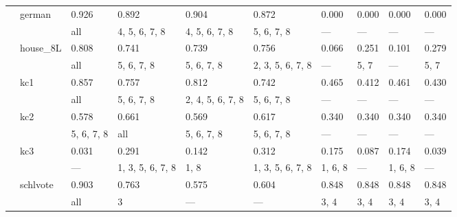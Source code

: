 \documentclass{article}
\begin{document}
\begin{center}
\begin{longtable}{p{1.2cm}p{1.8cm}p{1cm}p{1cm}p{1cm}p{1cm}p{1cm}p{1cm}p{1cm}p{1cm}}
             & german       & 0.926         & 0.892            & 0.904            & 0.872            & 0.000            & 0.000            & 0.000            & 0.000            \\
             &              & all           & 4, 5, 6, 7, 8    & 4, 5, 6, 7, 8    & 5, 6, 7, 8       & ---              & ---              & ---              & ---              \\
             & house\_8L     & 0.808         & 0.741            & 0.739            & 0.756            & 0.066            & 0.251            & 0.101            & 0.279            \\
             &              & all           & 5, 6, 7, 8       & 5, 6, 7, 8       & 2, 3, 5, 6, 7, 8 & ---              & 5, 7             & ---              & 5, 7             \\
             & kc1          & 0.857         & 0.757            & 0.812            & 0.742            & 0.465            & 0.412            & 0.461            & 0.430            \\
             &              & all           & 5, 6, 7, 8       & 2, 4, 5, 6, 7, 8 & 5, 6, 7, 8       & ---              & ---              & ---              & ---              \\
             & kc2          & 0.578         & 0.661            & 0.569            & 0.617            & 0.340            & 0.340            & 0.340            & 0.340            \\
             &              & 5, 6, 7, 8    & all              & 5, 6, 7, 8       & 5, 6, 7, 8       & ---              & ---              & ---              & ---              \\
             & kc3          & 0.031         & 0.291            & 0.142            & 0.312            & 0.175            & 0.087            & 0.174            & 0.039            \\
             &              & ---           & 1, 3, 5, 6, 7, 8 & 1, 8             & 1, 3, 5, 6, 7, 8 & 1, 6, 8          & ---              & 1, 6, 8          & ---              \\
             & schlvote     & 0.903         & 0.763            & 0.575            & 0.604            & 0.848            & 0.848            & 0.848            & 0.848            \\
             &              & all           & 3                & ---              & ---              & 3, 4             & 3, 4             & 3, 4             & 3, 4             \\

\end{longtable}
\end{center}
\end{document}
